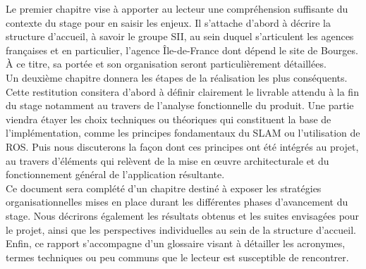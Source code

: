 Le premier chapitre vise à apporter au lecteur une compréhension suffisante du contexte du stage pour en saisir les enjeux. 
Il s'attache d'abord à décrire la structure d'accueil, à savoir le groupe \gls{SII}, au sein duquel s'articulent les agences françaises et en particulier, l'agence \^{I}le-de-France
dont dépend le site de Bourges. 
\`{A} ce titre, sa portée et son organisation seront particulièrement détaillées. \\
Un deuxième chapitre donnera les étapes de la réalisation les plus conséquents. 
Cette restitution consitera d'abord à définir clairement le livrable attendu à la fin du stage notamment au travers de l'analyse fonctionnelle du produit.
Une partie viendra étayer les choix techniques ou théoriques qui constituent la base de l'implémentation, comme les principes fondamentaux du \gls{SLAM} ou l'utilisation de \gls{ROS}. 
Puis nous discuterons la façon dont ces principes ont été intégrés au projet, au travers d'éléments qui relèvent de la mise en \oe{}uvre architecturale et du fonctionnement général de l'application résultante.\\
Ce document sera complété d'un chapitre destiné à exposer les stratégies organisationnelles mises en place durant les différentes phases d'avancement du stage. 
Nous décrirons également les résultats obtenus et les suites envisagées pour le projet, ainsi que les perspectives individuelles au sein de la structure d'accueil. \\
Enfin, ce rapport s'accompagne d'un glossaire visant à détailler les acronymes, termes techniques ou peu communs que le lecteur est susceptible de rencontrer. 